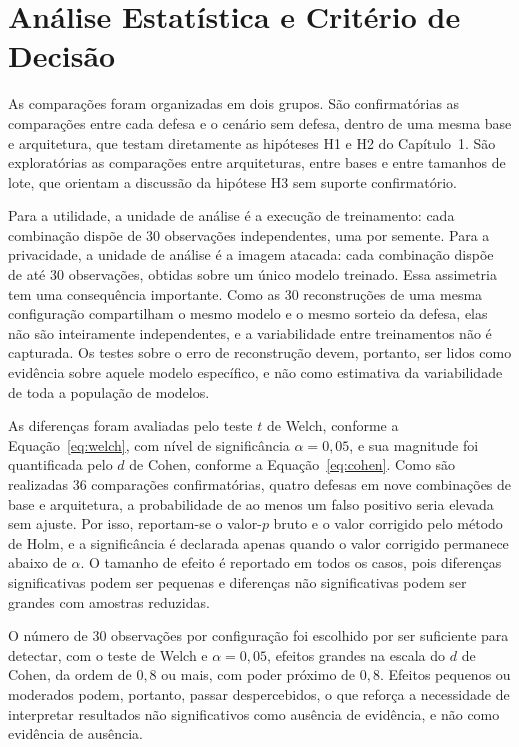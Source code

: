 \section{Análise Estatística e Critério de Decisão} \label{sec:analise}

As comparações foram organizadas em dois grupos. São confirmatórias as comparações entre cada defesa e o cenário sem defesa, dentro de uma mesma base e arquitetura, que testam diretamente as hipóteses H1 e H2 do Capítulo~1. São exploratórias as comparações entre arquiteturas, entre bases e entre tamanhos de lote, que orientam a discussão da hipótese H3 sem suporte confirmatório.

Para a utilidade, a unidade de análise é a execução de treinamento: cada combinação dispõe de 30 observações independentes, uma por semente. Para a privacidade, a unidade de análise é a imagem atacada: cada combinação dispõe de até 30 observações, obtidas sobre um único modelo treinado. Essa assimetria tem uma consequência importante. Como as 30 reconstruções de uma mesma configuração compartilham o mesmo modelo e o mesmo sorteio da defesa, elas não são inteiramente independentes, e a variabilidade entre treinamentos não é capturada. Os testes sobre o erro de reconstrução devem, portanto, ser lidos como evidência sobre aquele modelo específico, e não como estimativa da variabilidade de toda a população de modelos.

As diferenças foram avaliadas pelo teste $t$ de Welch, conforme a Equação~\ref{eq:welch}, com nível de significância $\alpha = 0{,}05$, e sua magnitude foi quantificada pelo $d$ de Cohen, conforme a Equação~\ref{eq:cohen}. Como são realizadas 36 comparações confirmatórias, quatro defesas em nove combinações de base e arquitetura, a probabilidade de ao menos um falso positivo seria elevada sem ajuste. Por isso, reportam-se o valor-$p$ bruto e o valor corrigido pelo método de Holm, e a significância é declarada apenas quando o valor corrigido permanece abaixo de $\alpha$. O tamanho de efeito é reportado em todos os casos, pois diferenças significativas podem ser pequenas e diferenças não significativas podem ser grandes com amostras reduzidas.

O número de 30 observações por configuração foi escolhido por ser suficiente para detectar, com o teste de Welch e $\alpha = 0{,}05$, efeitos grandes na escala do $d$ de Cohen, da ordem de $0{,}8$ ou mais, com poder próximo de $0{,}8$. Efeitos pequenos ou moderados podem, portanto, passar despercebidos, o que reforça a necessidade de interpretar resultados não significativos como ausência de evidência, e não como evidência de ausência.


